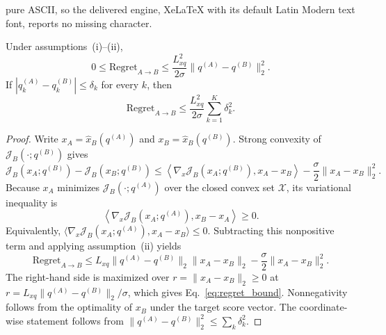 \documentclass[10pt,a4paper]{amsart}
\begin{document}
pure ASCII, so the delivered engine, XeLaTeX with its default Latin Modern text font, reports no missing character.
\begin{theorem}
\label{thm:transfer}
Under assumptions~(i)--(ii),
\begin{equation}
\label{eq:regret_bound}
0\le \mathrm{Regret}_{A\to B}
\le
\frac{L_{xq}^2}{2\sigma}
\|q^{(A)}-q^{(B)}\|_2^2.
\end{equation}
If $|q_k^{(A)}-q_k^{(B)}|\le\delta_k$ for every $k$, then
\[
\mathrm{Regret}_{A\to B}
\le
\frac{L_{xq}^2}{2\sigma}\sum_{k=1}^K\delta_k^2.
\]
\end{theorem}

\begin{proof}
Write $x_A=\widehat x_B(q^{(A)})$ and
$x_B=\widehat x_B(q^{(B)})$. Strong convexity of
$\mathcal J_B(\cdot;q^{(B)})$ gives
\begin{equation*}
\mathcal J_B(x_A;q^{(B)})-\mathcal J_B(x_B;q^{(B)})
\le
\left\langle\nabla_x\mathcal J_B(x_A;q^{(B)}),x_A-x_B\right\rangle
-\frac{\sigma}{2}\|x_A-x_B\|_2^2.
\end{equation*}
Because $x_A$ minimizes $\mathcal J_B(\cdot;q^{(A)})$ over the closed
convex set $\mathcal X$, its variational inequality is
\[
\left\langle\nabla_x\mathcal J_B(x_A;q^{(A)}),x_B-x_A\right\rangle\ge0.
\]
Equivalently,
$\langle\nabla_x\mathcal J_B(x_A;q^{(A)}),x_A-x_B\rangle\le0$.
Subtracting this nonpositive term and applying assumption~(ii) yields
\begin{equation*}
\mathrm{Regret}_{A\to B}
\le
L_{xq}\|q^{(A)}-q^{(B)}\|_2\|x_A-x_B\|_2
-\frac{\sigma}{2}\|x_A-x_B\|_2^2.
\end{equation*}
The right-hand side is maximized over
$r=\|x_A-x_B\|_2\ge0$ at
$r=L_{xq}\|q^{(A)}-q^{(B)}\|_2/\sigma$, which gives
Eq.~\eqref{eq:regret_bound}. Nonnegativity follows from the optimality of
$x_B$ under the target score vector. The coordinate-wise statement follows
from $\|q^{(A)}-q^{(B)}\|_2^2\le\sum_k\delta_k^2$.
\end{proof}
\end{document}
